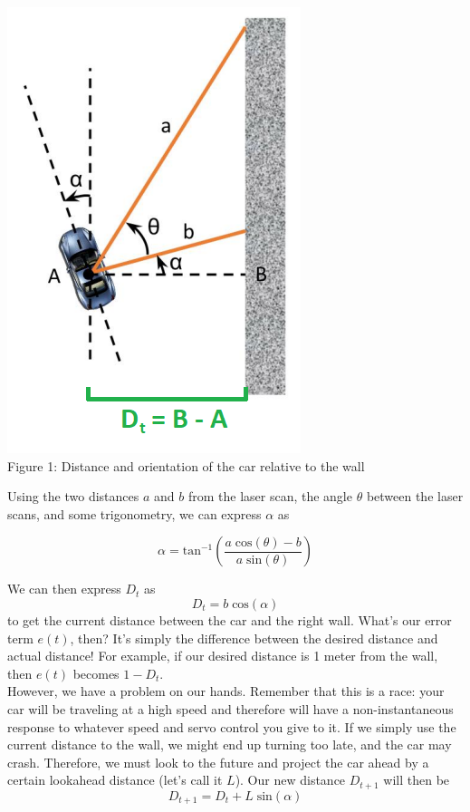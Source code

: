 \documentclass[letta4 paper]{article}
\numberwithin{equation}{section}
\newcommand{\0}{\mathbf{0}}
\begin{document}
	\begin{center}
		\includegraphics[scale=0.75]{wall_following_lab_figure_1.png}\\
		\label{fig:fig1}
		Figure 1: Distance and orientation of the car relative to the wall
	\end{center}
	
	Using the two distances $a$ and $b$ from the laser scan, the angle $\theta$ between the laser scans, and some trigonometry, we can express $\alpha$ as
	
	\begin{equation}
	\label{eq:alpha}
	\alpha = \mbox{tan}^{-1}\left(\frac{a \; \mbox{cos}(\theta) - b}{a \; \mbox{sin}(\theta)}\right)
	\end{equation}
	
	We can then express $D_t$ as 
	\begin{equation*}
	D_t = b \; \mbox{cos}(\alpha)
	\end{equation*}
	to get the current distance between the car and the right wall. What's our error term $e(t)$, then? It's simply the difference between the desired distance and actual distance! For example, if our desired distance is 1 meter from the wall, then $e(t)$ becomes $1 - D_t$.\\
	
	However, we have a problem on our hands. Remember that this is a race: your car will be traveling at a high speed and therefore will have a non-instantaneous response to whatever speed and servo control you give to it. If we simply use the current distance to the wall, we might end up turning too late, and the car may crash. Therefore, we must look to the future and project the car ahead by a certain lookahead distance (let's call it $L$). Our new distance $D_{t+1}$ will then be
	\begin{equation*}
	D_{t+1} = D_t + L \; \mbox{sin}(\alpha)
	\end{equation*}
	
\end{document}
